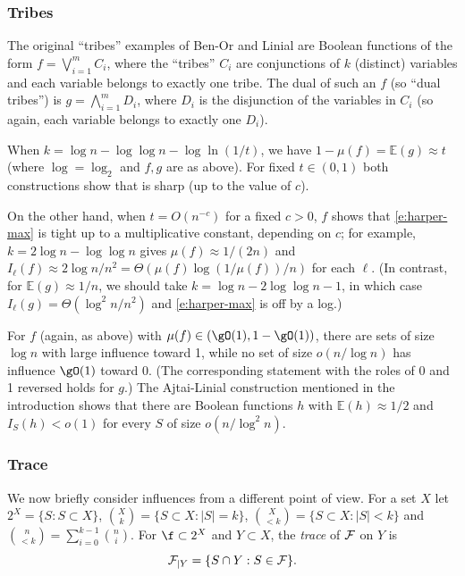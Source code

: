 \subsubsection *{Tribes}
The original ``tribes'' examples of Ben-Or and Linial \cite{bl}
are Boolean functions of the form
$f= \bigvee_{i=1}^m C_i$, where the   %
``tribes'' $C_i$ are %
conjunctions %
of $k$ (distinct) variables
and
each variable belongs to exactly one tribe.
The dual of such an $f$ (so ``dual tribes'') is
%
$g= \bigwedge_{i=1}^m D_i$, where  %
$D_i$ is the %
disjunction %
of the variables in $C_i$
(so again, each variable belongs to exactly one $D_i$).

When $k=\log n - \log \log n - \log \ln (1/t)$,
we have $1-\mu(f)  = \mathbb E (g) \approx t$
(where $\log = \log_2$ and $f,g$ are as above).
For fixed $t\in (0,1)$ both constructions
show that 
is sharp (up to the value of $c$).


On the other hand,
when $t=O(n^{-c})$ for a fixed
$c>0$, $f$ shows that \eqref{e:harper-max}
is tight up to a multiplicative constant, depending on $c$;
for example,
$k=2\log n-\log \log n$ gives
$\mu(f)  \approx 1/(2n)$ and
$I_\ell(f)\approx 2\log n/n^2=\Theta(\mu(f) \log(1/\mu(f) )/n)$
for each $\ell$.
(In contrast, for $\mathbb E (g)\approx 1/n$, we should
take $k= \log n-2\log \log n-1$, in which case
$I_\ell (g)=\Theta (\log^2n/n^2)$ and \eqref{e:harper-max}
is off by a log.)

For $f$ (again, as above) with $\mu(f)  \in (\gO(1),1-\gO(1))$,
there are sets of size $\log n$ with large influence
%
toward 1,  %
while no set of size $o(n/\log n)$ has
influence $\gO(1)$ %
toward 0.
(The corresponding statement with
the roles of 0 and 1 reversed holds for $g$.)
The Ajtai-Linial construction
mentioned in the introduction shows that there are Boolean functions
$h$ with $\mathbb E (h) \approx 1/2$ and $I_S(h) < o(1)$ for
every $S$ of size $o(n/\log^2n)$.



\subsubsection *{Trace}


We now briefly consider influences from a different point of view.
For a set $X$ let
$2^X = \{S: S \subset X\}$,
$\binom{X}{k}=\{S \subset X:|S|=k\}$,
$\binom{X}{< k}=\{S \subset X:|S| < k\}$ and 
$\binom{n}{<k}=\sum_{i=0}^{k-1} \binom{n}{i}.$
For $\f\subset 2^X$
and $Y \subset X$,
the \emph{trace} of $\cal F$ on $Y$ is
$${\cal F}_{|Y} = \{S \cap Y:
S \in {\cal F}\}.$$

